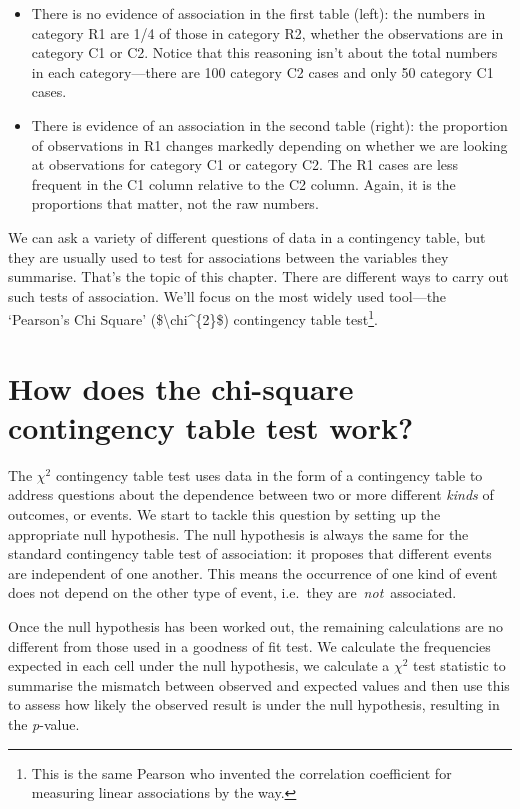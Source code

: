 \documentclass[
]{book}
\begin{document}
\begin{itemize}
\item
  There is no evidence of association in the first table (left): the numbers in category R1 are 1/4 of those in category R2, whether the observations are in category C1 or C2. Notice that this reasoning isn't about the total numbers in each category---there are 100 category C2 cases and only 50 category C1 cases.
\item
  There is evidence of an association in the second table (right): the proportion of observations in R1 changes markedly depending on whether we are looking at observations for category C1 or category C2. The R1 cases are less frequent in the C1 column relative to the C2 column. Again, it is the proportions that matter, not the raw numbers.
\end{itemize}

We can ask a variety of different questions of data in a contingency table, but they are usually used to test for associations between the variables they summarise. That's the topic of this chapter. There are different ways to carry out such tests of association. We'll focus on the most widely used tool---the `Pearson's Chi Square' (\$\textbackslash chi\^{}\{2\}\$) contingency table test\footnote{This is the same Pearson who invented the correlation coefficient for measuring linear associations by the way.}.

\hypertarget{how-does-the-chi-square-contingency-table-test-work}{%
\section{How does the chi-square contingency table test work?}\label{how-does-the-chi-square-contingency-table-test-work}}

The \(\chi^{2}\) contingency table test uses data in the form of a contingency table to address questions about the dependence between two or more different \emph{kinds} of outcomes, or events. We start to tackle this question by setting up the appropriate null hypothesis. The null hypothesis is always the same for the standard contingency table test of association: it proposes that different events are independent of one another. This means the occurrence of one kind of event does not depend on the other type of event, i.e.~they are~\emph{not}~associated.

Once the null hypothesis has been worked out, the remaining calculations are no different from those used in a goodness of fit test. We calculate the frequencies expected in each cell under the null hypothesis, we calculate a \(\chi^{2}\) test statistic to summarise the mismatch between observed and expected values and then use this to assess how likely the observed result is under the null hypothesis, resulting in the \emph{p}-value.
\end{document}
